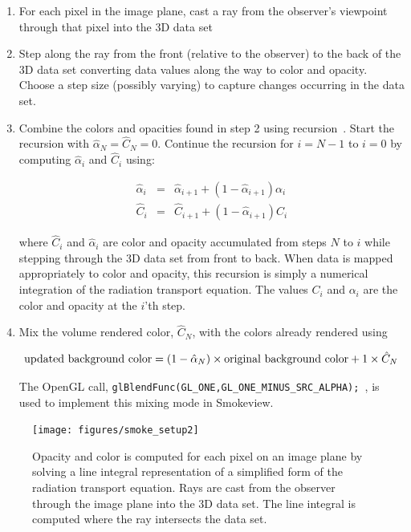 \begin{enumerate}

\item For each pixel in the image plane, cast a ray from the observer's viewpoint through that pixel into the 3D data set

\item Step along the ray from the front (relative to the observer) to the back of the 3D data set converting data values along the way to color and opacity.  Choose a step size (possibly varying) to capture changes occurring in the data set.

\item
Combine the colors and opacities found in step 2 using recursion~\cite[Chapter 39]{gpugems}.
Start the recursion with $\hat{\alpha}_{N}=\hat{C}_{N}=0$. Continue the recursion for $i=N-1$ to $i=0$ by computing $\hat{\alpha}_i$ and $\hat{C}_i$ using:

\begin{eqnarray}
\label{eq:alphaupdate}
\hat{\alpha}_i&=&\hat{\alpha}_{i+1}+\left(1-\hat{\alpha}_{i+1}\right)\alpha_i\\
\label{eq:colorupdate}
\hat{C}_i&=&\hat{C}_{i+1}+\left(1-\hat{\alpha}_{i+1}\right)C_i
\end{eqnarray}

where $\hat{C}_i$ and $\hat{\alpha}_i$ are color and opacity accumulated from steps $N$ to $i$ while stepping through the 3D data set from front to back.  When data is mapped appropriately to color and opacity, this recursion is simply a numerical integration of the radiation transport equation.
The values $C_i$ and $\alpha_i$ are the color and opacity at the $i$'th step.

\item Mix the volume rendered color, $\hat{C}_N$, with the colors already rendered using

\begin{eqnarray*}
\noindent\mbox{updated background color} = (1-\hat{\alpha}_N)\times \mbox{original background color} + 1\times\hat{C}_N
\end{eqnarray*}

The OpenGL call, {\tt   glBlendFunc(GL\_ONE,GL\_ONE\_MINUS\_SRC\_ALPHA); }, is used to implement this mixing mode in Smokeview.
\end{enumerate}

\begin{figure}[\figoptions]
\begin{center}
\texttt{[image: figures/smoke\_setup2]}
\end{center}
\caption[Opacity and color is computed for each pixel on an image plane by solving a line integral
representation of a simplified form of the radiation transport equation.]{Opacity and color is computed for each pixel on an image plane by solving a line integral
representation of a simplified form of the radiation transport equation.  Rays are cast from the observer through the  image plane into the 3D data set.  The line integral is computed where the ray intersects the data set.
}
\label{figsmokesetup2}
\end{figure}

